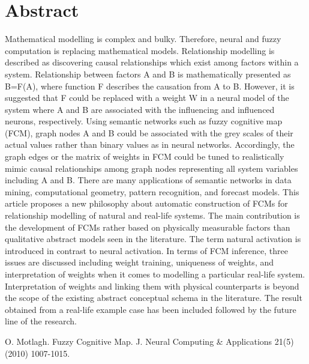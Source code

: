 \documentclass[article,A4,11pt]{llncs}%
\begin{document}
\section*{Abstract}
Mathematical modelling is complex and bulky. Therefore, neural and fuzzy computation is replacing mathematical models. Relationship modelling is described as discovering causal relationships which exist among factors within a system. Relationship between factors A and B is mathematically presented as B=F(A), where function F describes the causation from A to B. However, it is suggested that F could be replaced with a weight W in a neural model of the system where A and B are associated with the influencing and influenced neurons, respectively. Using semantic networks such as fuzzy cognitive map (FCM), graph nodes A and B could be associated with the grey scales of their actual values rather than binary values as in neural networks. Accordingly, the graph edges or the matrix of weights in FCM could be tuned to realistically mimic causal relationships among graph nodes representing all system variables including A and B. There are many applications of semantic networks in data mining, computational geometry, pattern recognition, and forecast models. This article proposes a new philosophy about automatic construction of FCMs for relationship modelling of natural and real-life systems. The main contribution is the development of FCMs rather based on physically measurable factors than qualitative abstract models seen in the literature. The term natural activation is introduced in contrast to neural activation. In terms of FCM inference, three issues are discussed including weight training, uniqueness of weights, and interpretation of weights when it comes to modelling a particular real-life system. Interpretation of weights and linking them with physical counterparts is beyond the scope of the existing abstract conceptual schema in the literature. The result obtained from a real-life example case has been included followed by the future line of the research.


\begin{thebibliography}{10}
{\sc O. Motlagh}. {Fuzzy Cognitive Map}. J. Neural Computing \& Applications 21(5) (2010) 1007-1015.
\end{thebibliography}
\end{document}
